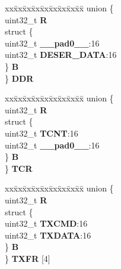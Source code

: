 \begin{DoxyCompactItemize}
\begin{tabbing}
\end{tabbing}\item 
\mbox{\label{structDSPI__tag_a3e55e69dbea86410668dc2b80cf3ab87}} 
\begin{tabbing}
xx\=xx\=xx\=xx\=xx\=xx\=xx\=xx\=xx\=\kill
union \{\\
\>uint32\_t {\bfseries R}\\
\>struct \{\\
\>\>uint32\_t {\bfseries \_\_pad0\_\_}:16\\
\>\>uint32\_t {\bfseries DESER\_DATA}:16\\
\>\} {\bfseries B}\\
\} {\bfseries DDR}\\

\end{tabbing}\item 
\mbox{\label{structDSPI__tag_a7206cb4b70506112ba0353e861388ef4}} 
\begin{tabbing}
xx\=xx\=xx\=xx\=xx\=xx\=xx\=xx\=xx\=\kill
union \{\\
\>uint32\_t {\bfseries R}\\
\>struct \{\\
\>\>uint32\_t {\bfseries TCNT}:16\\
\>\>uint32\_t {\bfseries \_\_pad0\_\_}:16\\
\>\} {\bfseries B}\\
\} {\bfseries TCR}\\

\end{tabbing}\item 
\mbox{\label{structDSPI__tag_a0e4d83a42aca02307904778b2eaf455a}} 
\begin{tabbing}
xx\=xx\=xx\=xx\=xx\=xx\=xx\=xx\=xx\=\kill
union \{\\
\>uint32\_t {\bfseries R}\\
\>struct \{\\
\>\>uint32\_t {\bfseries TXCMD}:16\\
\>\>uint32\_t {\bfseries TXDATA}:16\\
\>\} {\bfseries B}\\
\} {\bfseries TXFR} \mbox{[}4\mbox{]}\\


\end{tabbing}
\end{DoxyCompactItemize}
